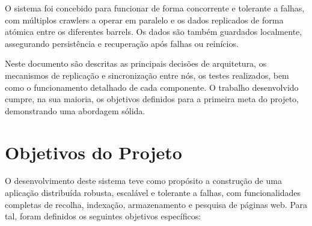 \documentclass{article}
\begin{document}
O sistema foi concebido para funcionar de forma concorrente e tolerante a falhas, com múltiplos crawlers a operar em paralelo e os dados replicados de forma atómica entre os diferentes barrels. Os dados são também guardados localmente, assegurando persistência e recuperação após falhas ou reinícios.

Neste documento são descritas as principais decisões de arquitetura, os mecanismos de replicação e sincronização entre nós, os testes realizados, bem como o funcionamento detalhado de cada componente. 
O trabalho desenvolvido cumpre, na sua maioria, os objetivos definidos para a primeira meta do projeto, demonstrando uma abordagem sólida.


















\newpage
\section{Objetivos do Projeto}
O desenvolvimento deste sistema teve como propósito a construção de uma aplicação distribuída robusta, escalável e tolerante a falhas, com funcionalidades completas de recolha, indexação, armazenamento e pesquisa de páginas web. 
\newline Para tal, foram definidos os seguintes objetivos específicos:
\end{document}

